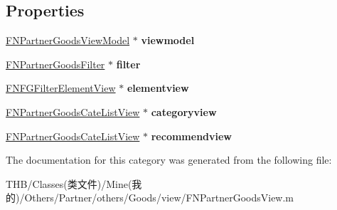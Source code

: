 \subsection*{Properties}
\begin{DoxyCompactItemize}
\item 
\mbox{\label{category_f_n_partner_goods_view_07_08_abbd67af9225b0b551e9607e8652c9b20}} 
\mbox{\hyperlink{interface_f_n_partner_goods_view_model}{F\+N\+Partner\+Goods\+View\+Model}} $\ast$ {\bfseries viewmodel}
\item 
\mbox{\label{category_f_n_partner_goods_view_07_08_a8d29bda4de209376d4b1caa41e0c39f5}} 
\mbox{\hyperlink{interface_f_n_partner_goods_filter}{F\+N\+Partner\+Goods\+Filter}} $\ast$ {\bfseries filter}
\item 
\mbox{\label{category_f_n_partner_goods_view_07_08_affc14f5e53672caa6bfea394355ea94d}} 
\mbox{\hyperlink{interface_f_n_f_g_filter_element_view}{F\+N\+F\+G\+Filter\+Element\+View}} $\ast$ {\bfseries elementview}
\item 
\mbox{\label{category_f_n_partner_goods_view_07_08_a3d27299ea5b7f3111560b28e0067c819}} 
\mbox{\hyperlink{interface_f_n_partner_goods_cate_list_view}{F\+N\+Partner\+Goods\+Cate\+List\+View}} $\ast$ {\bfseries categoryview}
\item 
\mbox{\label{category_f_n_partner_goods_view_07_08_add846fa05dce04f77836db8b490b3735}} 
\mbox{\hyperlink{interface_f_n_partner_goods_cate_list_view}{F\+N\+Partner\+Goods\+Cate\+List\+View}} $\ast$ {\bfseries recommendview}
\end{DoxyCompactItemize}


The documentation for this category was generated from the following file\+:\begin{DoxyCompactItemize}
\item 
T\+H\+B/\+Classes(类文件)/\+Mine(我的)/\+Others/\+Partner/others/\+Goods/view/F\+N\+Partner\+Goods\+View.\+m\end{DoxyCompactItemize}

